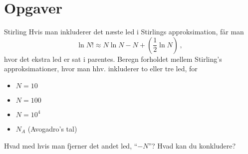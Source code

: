 \section{Opgaver}
\begin{opgave}{Stirling}
    Hvis man inkluderer det næste led i Stirlings approksimation, får man
    \[ \ln N!\approx N\ln N-N+\left(\frac{1}{2}\ln N\right) \, , \]
    hvor det ekstra led er sat i parentes. Beregn forholdet mellem Stirling's approksimationer, hvor man hhv. inkluderer to eller tre led, for
    \begin{itemize}
        \item $N=10$
        \item $N=100$
        \item $N=10^4$
        \item $N_A$ (Avogadro's tal)
    \end{itemize}
    Hvad med hvis man fjerner det andet led, ``$-N$''? Hvad kan du konkludere?
\end{opgave}
